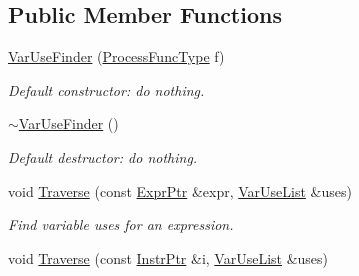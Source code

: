 \subsection*{Public Member Functions}
\begin{DoxyCompactItemize}
\item 
\mbox{\label{classilang_1_1_var_use_finder_abb89a083408c0f83a830bf703e277c21}} 
\mbox{\hyperlink{classilang_1_1_var_use_finder_abb89a083408c0f83a830bf703e277c21}{Var\+Use\+Finder}} (\mbox{\hyperlink{classilang_1_1_var_use_finder_a35047b745828c522532795ff7b45e05f}{Process\+Func\+Type}} f)
\begin{DoxyCompactList}\small\item\em Default constructor\+: do nothing. \end{DoxyCompactList}\item 
\mbox{\label{classilang_1_1_var_use_finder_a995028d1c9e15c4ec86cfaab58c0a2ed}} 
\mbox{\hyperlink{classilang_1_1_var_use_finder_a995028d1c9e15c4ec86cfaab58c0a2ed}{$\sim$\+Var\+Use\+Finder}} ()
\begin{DoxyCompactList}\small\item\em Default destructor\+: do nothing. \end{DoxyCompactList}\item 
\mbox{\label{classilang_1_1_var_use_finder_aeb7c838b78ce2d5e2f3f28ef9a49e850}} 
void \mbox{\hyperlink{classilang_1_1_var_use_finder_aeb7c838b78ce2d5e2f3f28ef9a49e850}{Traverse}} (const \mbox{\hyperlink{namespaceilang_a7c4196c72e53ea4df4b7861af7bc3bce}{Expr\+Ptr}} \&expr, \mbox{\hyperlink{classilang_1_1_var_use_finder_ab66effc0aea4f940ad1c7fed68151925}{Var\+Use\+List}} \&uses)
\begin{DoxyCompactList}\small\item\em Find variable uses for an expression. \end{DoxyCompactList}\item 
\mbox{\label{classilang_1_1_var_use_finder_a6788f83fef75bc892980b4135201437e}} 
void \mbox{\hyperlink{classilang_1_1_var_use_finder_a6788f83fef75bc892980b4135201437e}{Traverse}} (const \mbox{\hyperlink{namespaceilang_af88a19312ae653d687a0d1207bb284f6}{Instr\+Ptr}} \&i, \mbox{\hyperlink{classilang_1_1_var_use_finder_ab66effc0aea4f940ad1c7fed68151925}{Var\+Use\+List}} \&uses)

\end{DoxyCompactItemize}
